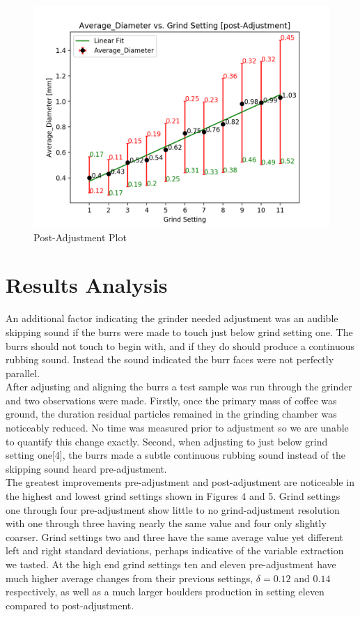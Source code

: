\documentclass[10pt,a4paper,twocolumn,notitlepage]{article}
\begin{document}
\begin{center}\begin{figure}[h!]
\includegraphics[width=\columnwidth]{postAdjustmentAverage_DiameterPlot.png}\caption{Post-Adjustment Plot}\label{fig:postAdjustmentGraph}\end{figure}\end{center}


\section{Results Analysis}
An additional factor indicating the grinder needed adjustment was an audible skipping sound if the burrs were made to touch just below grind setting one. The burrs should not touch to begin with, and if they do should produce a continuous rubbing sound. Instead the sound indicated the burr faces were not perfectly parallel. \\

After adjusting and aligning the burrs a test sample was run through the grinder and two observations were made. Firstly, once the primary mass of coffee was ground, the duration residual particles remained in the grinding chamber was noticeably reduced. No time was measured prior to adjustment so we are unable to quantify this change exactly. Second, when adjusting to just below grind setting one[4], the burrs made a subtle continuous rubbing sound instead of the skipping sound heard pre-adjustment. \\

The greatest improvements pre-adjustment and post-adjustment are noticeable in the highest and lowest grind settings shown in Figures 4 and 5. Grind settings one through four pre-adjustment show little to no grind-adjustment resolution with one through three having nearly the same value and four only slightly coarser. Grind settings two and three have the same average value yet different left and right standard deviations, perhaps indicative of the variable extraction we tasted. At the high end grind settings ten and eleven pre-adjustment have much higher average changes from their previous settings, $\delta=0.12$ and $0.14$ respectively, as well as a much larger boulders production in setting eleven compared to post-adjustment.\\
\end{document}
